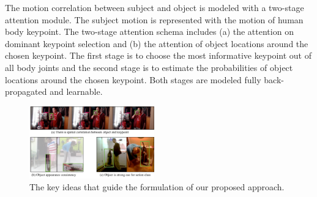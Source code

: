 The motion correlation between subject and object is modeled with a two-stage attention module. The subject motion is represented with the motion of human body keypoint. The two-stage attention schema includes (a) the attention on dominant keypoint selection and (b) the attention of object locations around the chosen keypoint. The first stage is to choose the most informative keypoint out of all body joints and the second stage is to estimate the probabilities of object locations around the chosen keypoint. Both stages are modeled fully back-propagated and learnable.

\begin{figure}
\includegraphics[width=0.48\textwidth]{figures/keyidea.pdf}
\caption{The key ideas that guide the formulation of our proposed approach.}
\label{fig:keyidea}
\end{figure}

